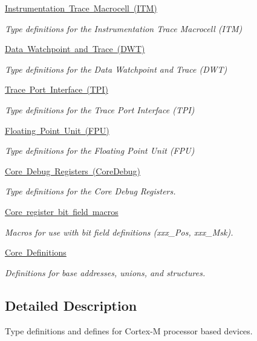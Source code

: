 \begin{DoxyCompactItemize}
\mbox{\hyperlink{group___c_m_s_i_s___i_t_m}{Instrumentation Trace Macrocell (\+I\+T\+M)}}
\begin{DoxyCompactList}\small\item\em Type definitions for the Instrumentation Trace Macrocell (I\+TM) \end{DoxyCompactList}\item 
\mbox{\hyperlink{group___c_m_s_i_s___d_w_t}{Data Watchpoint and Trace (\+D\+W\+T)}}
\begin{DoxyCompactList}\small\item\em Type definitions for the Data Watchpoint and Trace (D\+WT) \end{DoxyCompactList}\item 
\mbox{\hyperlink{group___c_m_s_i_s___t_p_i}{Trace Port Interface (\+T\+P\+I)}}
\begin{DoxyCompactList}\small\item\em Type definitions for the Trace Port Interface (T\+PI) \end{DoxyCompactList}\item 
\mbox{\hyperlink{group___c_m_s_i_s___f_p_u}{Floating Point Unit (\+F\+P\+U)}}
\begin{DoxyCompactList}\small\item\em Type definitions for the Floating Point Unit (F\+PU) \end{DoxyCompactList}\item 
\mbox{\hyperlink{group___c_m_s_i_s___core_debug}{Core Debug Registers (\+Core\+Debug)}}
\begin{DoxyCompactList}\small\item\em Type definitions for the Core Debug Registers. \end{DoxyCompactList}\item 
\mbox{\hyperlink{group___c_m_s_i_s__core__bitfield}{Core register bit field macros}}
\begin{DoxyCompactList}\small\item\em Macros for use with bit field definitions (xxx\+\_\+\+Pos, xxx\+\_\+\+Msk). \end{DoxyCompactList}\item 
\mbox{\hyperlink{group___c_m_s_i_s__core__base}{Core Definitions}}
\begin{DoxyCompactList}\small\item\em Definitions for base addresses, unions, and structures. \end{DoxyCompactList}\end{DoxyCompactItemize}


\subsection{Detailed Description}
Type definitions and defines for Cortex-\/M processor based devices. 

